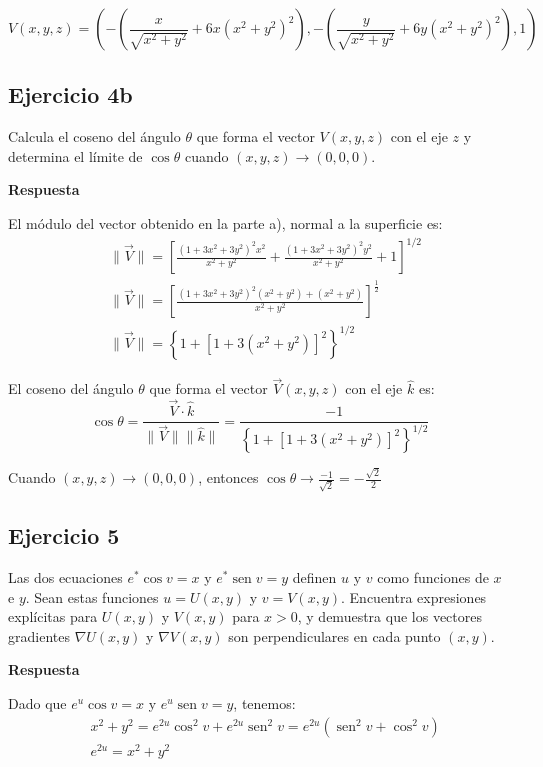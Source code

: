 \documentclass{report}
\begin{document}
    \[
    V(x, y, z) = \left( - \left( \frac{x}{\sqrt{x^2 + y^2}} + 6x \left( x^2 + y^2 \right)^2 \right), - \left( \frac{y}{\sqrt{x^2 + y^2}} + 6y \left( x^2 + y^2 \right)^2 \right), 1 \right)
    \]\subsection*{Ejercicio 4b}
    Calcula el coseno del ángulo $\theta$ que forma el vector $V(x, y, z)$ con el eje $z$ y determina el límite de $\cos \theta$ cuando $(x, y, z) \rightarrow(0,0,0)$.

    \textbf{Respuesta}

    El módulo del vector obtenido en la parte a), normal a la superficie es:
    $$
    \begin{aligned}
    & \|\vec{V}\|=\left[\frac{\left(1+3 x^2+3 y^2\right)^2 x^2}{x^2+y^2}+\frac{\left(1+3 x^2+3 y^2\right)^2 y^2}{x^2+y^2}+1\right]^{1 / 2} \\
    & \|\vec{V}\|=\left[\frac{\left(1+3 x^2+3 y^2\right)^2\left(x^2+y^2\right)+\left(x^2+y^2\right)}{x^2+y^2}\right]^{\frac{1}{2}} \\
    & \|\vec{V}\|=\left\{1+\left[1+3\left(x^2+y^2\right)\right]^2\right\}^{1 / 2}
    \end{aligned}
    $$

    El coseno del ángulo $\theta$ que forma el vector $\vec{V}(x, y, z)$ con el eje $\hat{k}$ es:
    $$
    \cos \theta=\frac{\vec{V} \cdot \hat{k}}{\|\vec{V}\| \|\hat{k}\|}=\frac{-1}{\left\{1+\left[1+3\left(x^2+y^2\right)\right]^2\right\}^{1 / 2}}
    $$

    Cuando $(x, y, z) \rightarrow(0,0,0)$, entonces $\cos \theta \rightarrow \frac{-1}{\sqrt{2}}=-\frac{\sqrt{2}}{2}$\subsection*{Ejercicio 5}
    Las dos ecuaciones $e^{*} \cos v=x$ y $e^{*} \operatorname{sen} v=y$ definen $u$ y $v$ como funciones de $x$ e $y$. Sean estas funciones $u=U(x, y)$ y $v=V(x, y)$. Encuentra expresiones explícitas para $U(x, y)$ y $V(x, y)$ para $x>0$, y demuestra que los vectores gradientes $\nabla U(x, y)$ y $\nabla V(x, y)$ son perpendiculares en cada punto $(x, y)$.

    \textbf{Respuesta}

    Dado que $e^u \cos v = x$ y $e^u \operatorname{sen} v = y$, tenemos:
    $$
    \begin{aligned}
    & x^2 + y^2 = e^{2u} \cos^2 v + e^{2u} \operatorname{sen}^2 v = e^{2u} (\operatorname{sen}^2 v + \cos^2 v) \\
    & e^{2u} = x^2 + y^2
    \end{aligned}
    $$
\end{document}

